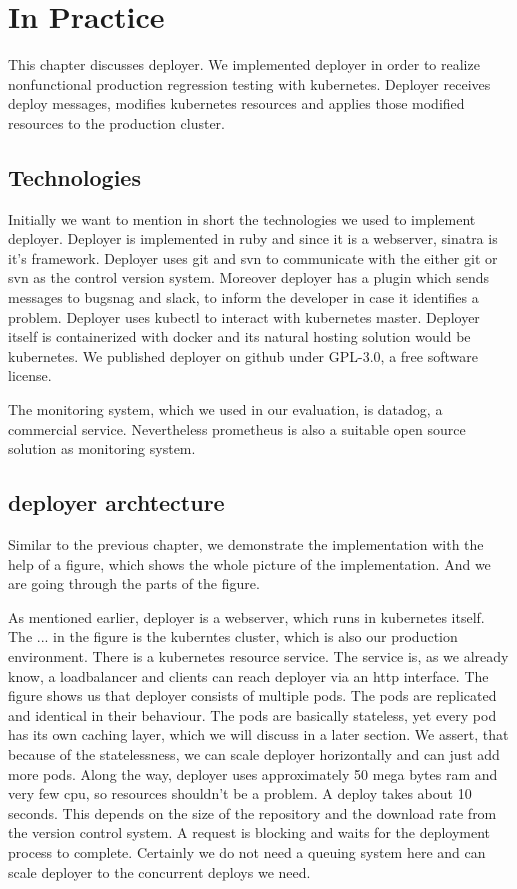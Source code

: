 \chapter{In Practice}

This chapter discusses deployer. We implemented deployer in order to realize nonfunctional production regression testing with kubernetes. Deployer receives deploy messages, modifies kubernetes resources and applies those modified resources to the production cluster.


\section{Technologies}

Initially we want to mention in short the technologies we used to implement deployer. Deployer
is implemented in ruby and since it is a webserver, sinatra is it's framework. Deployer
uses git and svn to communicate with the either git or svn as the control version system. Moreover deployer has a
plugin which sends messages to bugsnag and slack, to inform the developer in case it
identifies a problem. Deployer uses kubectl to interact with
kubernetes master. Deployer itself is containerized with docker and its natural hosting
solution would be kubernetes. We published deployer on github under GPL-3.0, a free
software license.

The monitoring system, which we used in our evaluation, is datadog, a commercial
service. Nevertheless prometheus is also a suitable open source solution as monitoring
system.

\section{deployer archtecture}

Similar to the previous chapter, we demonstrate the implementation with the help of
a figure, which shows the whole picture of the implementation. And we are going through
the parts of the figure.

As mentioned earlier, deployer is a webserver, which runs in kubernetes itself. The ... in
the figure is the kuberntes cluster, which is also our production environment. There is a
kubernetes resource service. The service is, as we already know, a loadbalancer and
clients can reach deployer via an http interface. The figure shows us that deployer consists of multiple pods. The pods are replicated and identical in their behaviour. The
pods are basically stateless, yet every pod has its own caching layer, which we will
discuss in a later section. We assert, that because of the statelessness, we can scale
deployer horizontally and can just add more pods. Along the way, deployer uses
approximately 50 mega bytes ram and very few cpu, so resources shouldn't be a problem. A
deploy takes about 10 seconds. This depends on the size of the repository and the download
rate from the version control system. A request is blocking and waits for the deployment
process to complete. Certainly we do not need a queuing system here and can scale deployer
to the concurrent deploys we need.


